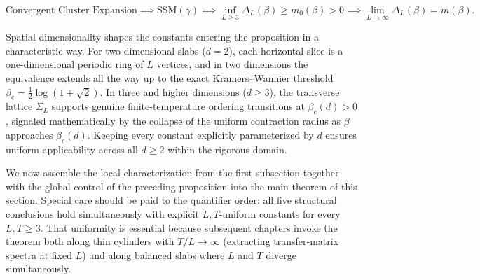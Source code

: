 \documentclass[11pt]{article}
\theoremstyle{definition}
\begin{document}
\[
  \text{Convergent Cluster Expansion} \implies \text{SSM}(\gamma) \implies \inf_{L \ge 3} \Delta_L(\beta) \ge m_0(\beta) > 0 \implies \lim_{L \to \infty} \Delta_L(\beta) = m(\beta).
\]

Spatial dimensionality shapes the constants entering the proposition in a
characteristic way. For two-dimensional slabs ($d = 2$), each horizontal slice is a
one-dimensional periodic ring of $L$ vertices, and in two dimensions the equivalence
extends all the way up to the exact Kramers--Wannier threshold $\beta_c =
\frac{1}{2}\log(1 + \sqrt{2})$. In three and higher dimensions ($d \ge 3$), the
transverse lattice $\Sigma_L$ supports genuine finite-temperature ordering
transitions at $\beta_c(d) > 0$, signaled mathematically by the collapse of the
uniform contraction radius as $\beta$ approaches $\beta_c(d)$. Keeping every
constant explicitly parameterized by $d$ ensures uniform applicability across all $d
\ge 2$ within the rigorous domain.

We now assemble the local characterization from the first subsection together with
the global control of the preceding proposition into the main theorem of this
section. Special care should be paid to the quantifier order: all five structural
conclusions hold simultaneously with explicit $L, T$-uniform constants for every $L,
T \ge 3$. That uniformity is essential because subsequent chapters invoke the
theorem both along thin cylinders with $T/L \to \infty$ (extracting transfer-matrix
spectra at fixed $L$) and along balanced slabs where $L$ and $T$ diverge
simultaneously.
\end{document}
